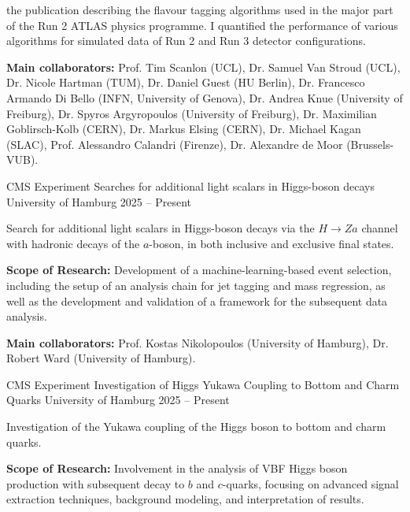 \begin{cventries}
{\begin{cvitems}
    the publication describing the flavour tagging algorithms used in the major part of the Run 2
    ATLAS physics programme. I quantified the performance of various algorithms for simulated
    data of Run 2 and Run 3 detector configurations.
    \item \textbf{Main collaborators:} Prof. Tim Scanlon (UCL), Dr. Samuel Van Stroud (UCL), Dr. Nicole
    Hartman (TUM), Dr. Daniel Guest (HU Berlin), Dr. Francesco Armando Di Bello (INFN,
    University of Genova), Dr. Andrea Knue (University of Freiburg), Dr. Spyros Argyropoulos (University of Freiburg), Dr. Maximilian Goblirsch-Kolb (CERN), Dr. Markus Elsing (CERN),
    Dr. Michael Kagan (SLAC), Prof. Alessandro Calandri (Firenze), Dr. Alexandre de Moor (Brussels-VUB).
  \end{cvitems}
}
\cventry
  {CMS Experiment} %
  {Searches for additional light scalars in Higgs-boson decays} %
  {University of Hamburg} %
  {2025 -- Present} %
{
  \begin{cvitems} %
    \item {Search for additional light scalars in Higgs-boson decays via the \(H \rightarrow Za\) channel with hadronic decays of the \(a\)-boson, in both inclusive and exclusive final states.}
    \item \textbf{Scope of Research:} Development of a machine-learning-based event selection, including the setup of an analysis chain for jet tagging and mass regression, as well as the development and validation of a framework for the subsequent data analysis.   
    \item \textbf{Main collaborators:} Prof. Kostas Nikolopoulos (University of Hamburg), Dr. Robert Ward (University of Hamburg).
  \end{cvitems}
}
\cventry
  {CMS Experiment} %
  {Investigation of Higgs Yukawa Coupling to Bottom and Charm Quarks} %
  {University of Hamburg} %
  {2025 -- Present} %
{
  \begin{cvitems} %
    \item {Investigation of the Yukawa coupling of the Higgs boson to bottom and charm quarks.}
    \item \textbf{Scope of Research:} Involvement in the analysis of VBF Higgs boson production with subsequent decay to \(b\) and \(c\)-quarks, focusing on advanced signal extraction techniques, background modeling, and interpretation of results.  

\end{cvitems}}
\end{cventries}
